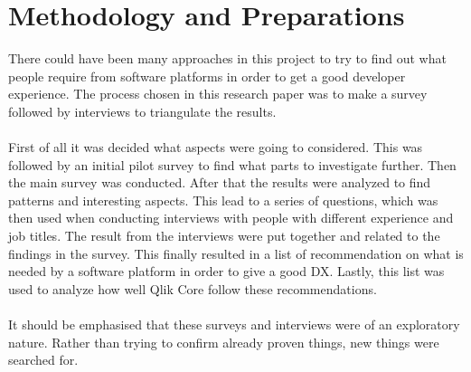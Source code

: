 \documentclass{cslthse-msc}
\begin{document}
    \chapter{Methodology and Preparations}

    There could have been many approaches in this project to try to find out
    what people require from software platforms in order to get a good developer experience. The process chosen in this research paper was to make
    a survey followed by interviews to triangulate the results.
    \\ \\
    First of all it was decided what aspects were going to considered. This was followed by an initial pilot survey to find what
    parts to investigate further. Then the main survey was conducted. After that the results were analyzed to find
    patterns and interesting aspects. This lead to a series of questions, which was then used when conducting interviews with people with
    different experience and job titles. The result from the interviews were put together and related to the findings in the survey.
    This finally resulted in a list of recommendation on what is needed by a software platform in order to give a good DX.
    Lastly, this list was used to analyze how well Qlik Core follow these recommendations.\\ \\
    It should be emphasised that these surveys and interviews were of an exploratory nature. Rather than trying to confirm already proven things, new things were searched for.
\end{document}
